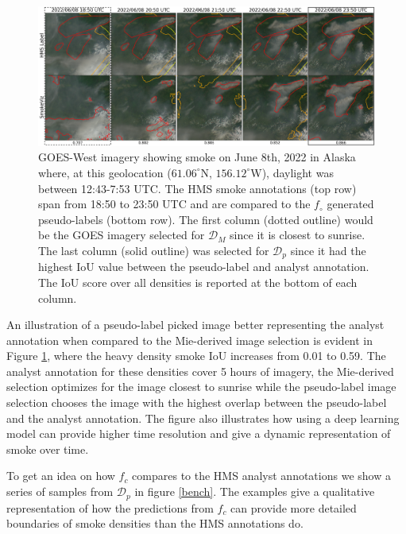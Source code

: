 \documentclass{article}
\begin{document}
\begin{figure}
    \centering
    \includegraphics[width=\linewidth]{figures/final_results.png}
    \caption{GOES-West imagery showing smoke on June 8th, 2022 in Alaska where, at this geolocation (\(61.06^{\circ}\)N, \(156.12^{\circ}\)W), daylight was between 12:43-7:53 UTC. The HMS smoke annotations (top row) span from 18:50 to 23:50 UTC and are compared to the \(f_{\circ}\) generated pseudo-labels (bottom row). The first column (dotted outline) would be the GOES imagery selected for \(\mathcal{D}_{M}\) since it is closest to sunrise. The last column (solid outline) was selected for \(\mathcal{D}_{p}\) since it had the highest IoU value between the pseudo-label and analyst annotation. The IoU score over all densities is reported at the bottom of each column.}
    \label{ml_vs_mei}
\end{figure}

An illustration of a pseudo-label picked image better representing the analyst annotation when compared to the Mie-derived image selection is evident in Figure \ref{ml_vs_mei}, where the heavy density smoke IoU increases from 0.01 to 0.59. The analyst annotation for these densities cover 5 hours of imagery, the Mie-derived selection optimizes for the image closest to sunrise while the pseudo-label image selection chooses the image with the highest overlap between the pseudo-label and the analyst annotation. The figure also illustrates how using a deep learning model can provide higher time resolution and give a dynamic representation of smoke over time.

To get an idea on how \(f_{c}\) compares to the HMS analyst annotations we show a series of samples from \(\mathcal{D}_{p}\) in figure \ref{bench}. The examples give a qualitative representation of how the predictions from \(f_c\) can provide more detailed boundaries of smoke densities than the HMS annotations do.
\end{document}
